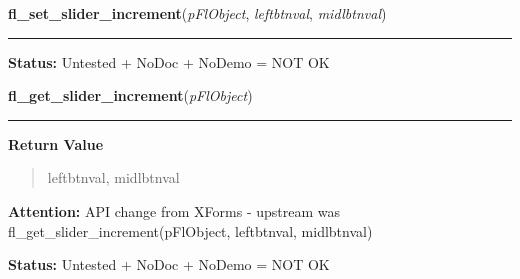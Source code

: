     \label{xformslib:flslider:fl_set_slider_increment}

    \vspace{0.5ex}

\hspace{.8\funcindent}\begin{boxedminipage}{\funcwidth}

    \raggedright \textbf{fl\_set\_slider\_increment}(\textit{pFlObject}, \textit{leftbtnval}, \textit{midlbtnval})

    \vspace{-1.5ex}

    \rule{\textwidth}{0.5\fboxrule}
\setlength{\parskip}{2ex}
\setlength{\parskip}{1ex}
\textbf{Status:} Untested + NoDoc + NoDemo = NOT OK



    \end{boxedminipage}

    \label{xformslib:flslider:fl_get_slider_increment}

    \vspace{0.5ex}

\hspace{.8\funcindent}\begin{boxedminipage}{\funcwidth}

    \raggedright \textbf{fl\_get\_slider\_increment}(\textit{pFlObject})

    \vspace{-1.5ex}

    \rule{\textwidth}{0.5\fboxrule}
\setlength{\parskip}{2ex}
\setlength{\parskip}{1ex}
      \textbf{Return Value}
    \vspace{-1ex}

      \begin{quote}
      leftbtnval, midlbtnval

      \end{quote}

\textbf{Attention:} API change from XForms - upstream was fl\_get\_slider\_increment(pFlObject,
leftbtnval, midlbtnval)



\textbf{Status:} Untested + NoDoc + NoDemo = NOT OK



    \end{boxedminipage}


